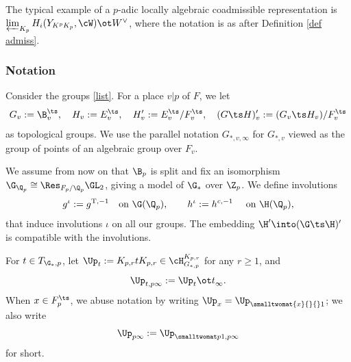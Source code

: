 The typical example of  a $p$-adic locally algebraic coadmissible  representation is
$\varprojlim_{K_{p}} H_{i}(Y_{K^{p}K_{p}}, \cW)\ot W^{\vee}$, where the notation is as after Definition \ref{def admiss}.







\subsubsection{Notation}
Consider the groups \eqref{list}. For a place $v\vert p$ of $F$, we let
 $$G_{v}:=\B_{v}^{\ts},\quad H_{v}:=E_{v}^{\ts},\quad H_{v}':=E_{v}^{\ts}/F_{v}^{\ts},\quad (G\ts H)'_{v}:= (G_{v}\ts H_{v})/F_{v}^{\ts}$$
 as topological groups. We use the parallel notation $G_{*, v, \infty}$ for $G_{*,v}$ viewed as the group of points of an algebraic group over $F_{v}$.



We assume from now on that $\B_{p}$ is split and fix an isomorphism $\G_{\Q_{p}}\cong \Res_{F_{p}/\Q_{p}}\GL_{2}$, giving a model of $\G_{*}$ over $\Z_{p}$. We define involutions
$$g^{\iota}:= g^{{\rm T}, -1} \quad \text{on $\G(\Q_{p})$}, \qquad h^{\iota}:=h^{c, -1} \quad \text{ on $\H(\Q_{p})$},$$ that induce involutions $\iota$ on all our groups. The embedding $\H'\into (\G\ts \H)'$ is compatible with the involutions.

For $t\in T_{\G_{*}, p}$,  let $\Up_{t}:= K_{p, r}
t K_{p,r}\in \cH^{K_{p,r}}_{G_{*, p}}$ for any $r\geq 1$, and
$$\Up_{t,p\infty}:=\Up_{t}\ot t_{\infty}^{}. $$
When $x\in F_{p}^{\ts}$, we abuse notation by writing $\Up_{x}= \Up_{\smalltwomat {x}{}{}1}$; we also write
$$\Up_{p\infty}:= \Up_{\smalltwomat p{}{}1, p\infty}$$
 for short.




